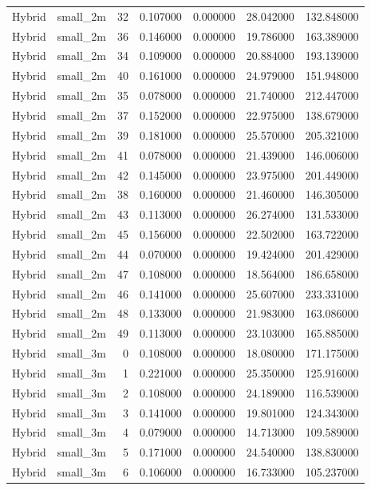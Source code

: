 \begin{tabular}{llrrrrr}
Hybrid & small_2m & 32 & 0.107000 & 0.000000 & 28.042000 & 132.848000 \\
Hybrid & small_2m & 36 & 0.146000 & 0.000000 & 19.786000 & 163.389000 \\
Hybrid & small_2m & 34 & 0.109000 & 0.000000 & 20.884000 & 193.139000 \\
Hybrid & small_2m & 40 & 0.161000 & 0.000000 & 24.979000 & 151.948000 \\
Hybrid & small_2m & 35 & 0.078000 & 0.000000 & 21.740000 & 212.447000 \\
Hybrid & small_2m & 37 & 0.152000 & 0.000000 & 22.975000 & 138.679000 \\
Hybrid & small_2m & 39 & 0.181000 & 0.000000 & 25.570000 & 205.321000 \\
Hybrid & small_2m & 41 & 0.078000 & 0.000000 & 21.439000 & 146.006000 \\
Hybrid & small_2m & 42 & 0.145000 & 0.000000 & 23.975000 & 201.449000 \\
Hybrid & small_2m & 38 & 0.160000 & 0.000000 & 21.460000 & 146.305000 \\
Hybrid & small_2m & 43 & 0.113000 & 0.000000 & 26.274000 & 131.533000 \\
Hybrid & small_2m & 45 & 0.156000 & 0.000000 & 22.502000 & 163.722000 \\
Hybrid & small_2m & 44 & 0.070000 & 0.000000 & 19.424000 & 201.429000 \\
Hybrid & small_2m & 47 & 0.108000 & 0.000000 & 18.564000 & 186.658000 \\
Hybrid & small_2m & 46 & 0.141000 & 0.000000 & 25.607000 & 233.331000 \\
Hybrid & small_2m & 48 & 0.133000 & 0.000000 & 21.983000 & 163.086000 \\
Hybrid & small_2m & 49 & 0.113000 & 0.000000 & 23.103000 & 165.885000 \\
Hybrid & small_3m & 0 & 0.108000 & 0.000000 & 18.080000 & 171.175000 \\
Hybrid & small_3m & 1 & 0.221000 & 0.000000 & 25.350000 & 125.916000 \\
Hybrid & small_3m & 2 & 0.108000 & 0.000000 & 24.189000 & 116.539000 \\
Hybrid & small_3m & 3 & 0.141000 & 0.000000 & 19.801000 & 124.343000 \\
Hybrid & small_3m & 4 & 0.079000 & 0.000000 & 14.713000 & 109.589000 \\
Hybrid & small_3m & 5 & 0.171000 & 0.000000 & 24.540000 & 138.830000 \\
Hybrid & small_3m & 6 & 0.106000 & 0.000000 & 16.733000 & 105.237000 \\

\end{tabular}
